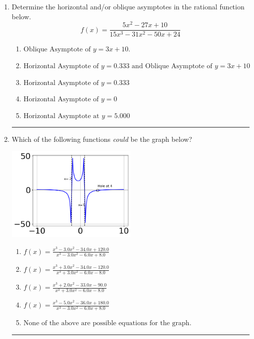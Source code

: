 \documentclass[14pt]{extbook}
\newcommand{\litem}[1]{\item#1\hspace*{-1cm}\rule{\textwidth}{0.4pt}}
\begin{document}
\begin{enumerate}
{\begin{enumerate}[label=\Alph*.]
\end{enumerate} }
\litem{
Determine the horizontal and/or oblique asymptotes in the rational function below.\[ f(x) = \frac{5x^{2} -27 x + 10}{15x^{3} -31 x^{2} -50 x + 24} \]\begin{enumerate}[label=\Alph*.]
\item \( \text{Oblique Asymptote of } y = 3x + 10. \)
\item \( \text{Horizontal Asymptote of } y = 0.333 \text{ and Oblique Asymptote of } y = 3x + 10 \)
\item \( \text{Horizontal Asymptote of } y = 0.333  \)
\item \( \text{Horizontal Asymptote of } y = 0 \)
\item \( \text{Horizontal Asymptote at } y = 5.000 \)

\end{enumerate} }
\litem{
Which of the following functions \textit{could} be the graph below?
\begin{center}
    \includegraphics[width=0.5\textwidth]{../Figures/identifyGraphOfRationalFunctionC.png}
\end{center}
\begin{enumerate}[label=\Alph*.]
\item \( f(x)=\frac{x^{3} -3.0 x^{2} -34.0 x + 120.0}{x^{3} -3.0 x^{2} -6.0 x + 8.0} \)
\item \( f(x)=\frac{x^{3} +3.0 x^{2} -34.0 x -120.0}{x^{3} +3.0 x^{2} -6.0 x -8.0} \)
\item \( f(x)=\frac{x^{3} +2.0 x^{2} -33.0 x -90.0}{x^{3} +3.0 x^{2} -6.0 x -8.0} \)
\item \( f(x)=\frac{x^{3} -5.0 x^{2} -36.0 x + 180.0}{x^{3} -3.0 x^{2} -6.0 x + 8.0} \)
\item \( \text{None of the above are possible equations for the graph.} \)


\end{enumerate}}
\end{enumerate}
\end{document}
